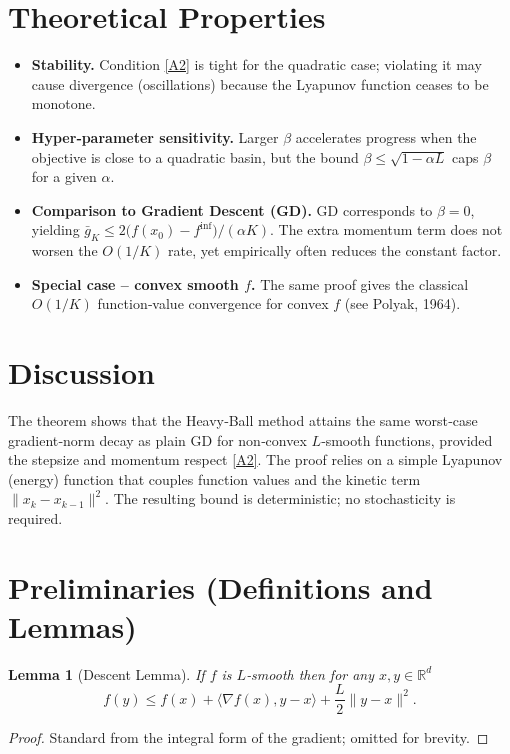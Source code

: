 \documentclass{article}
\newtheorem{lemma}{Lemma}
\newcommand{\R}{\mathbb{R}}
\begin{document}
\section*{Theoretical Properties}
\begin{itemize}
\item \textbf{Stability.} Condition \eqref{A2} is tight for the quadratic case; violating it may cause divergence (oscillations) because the Lyapunov function ceases to be monotone.

\item \textbf{Hyper‑parameter sensitivity.} Larger $\beta$ accelerates progress when the objective is close to a quadratic basin, but the bound $\beta\le\sqrt{1-\alpha L}$ caps $\beta$ for a given $\alpha$.

\item \textbf{Comparison to Gradient Descent (GD).} GD corresponds to $\beta=0$, yielding $\bar{g}_{K}\le 2\bigl(f(x_{0})-f^{\inf}\bigr)/(\alpha K)$. The extra momentum term does not worsen the $O(1/K)$ rate, yet empirically often reduces the constant factor.

\item \textbf{Special case – convex smooth $f$.} The same proof gives the classical $O(1/K)$ function‑value convergence for convex $f$ (see Polyak, 1964).
\end{itemize}

\section*{Discussion}
The theorem shows that the Heavy‑Ball method attains the same worst‑case gradient‑norm decay as plain GD for non‑convex $L$‑smooth functions, provided the stepsize and momentum respect \eqref{A2}. The proof relies on a simple Lyapunov (energy) function that couples function values and the kinetic term $\|x_{k}-x_{k-1}\|^{2}$. The resulting bound is deterministic; no stochasticity is required.

\newpage
\section*{Preliminaries (Definitions and Lemmas)}
\begin{lemma}[Descent Lemma]\label{lem:descent}
If $f$ is $L$‑smooth then for any $x,y\in\R^{d}$
\[
f(y)\le f(x)+\langle\nabla f(x),y-x\rangle+\frac{L}{2}\|y-x\|^{2}.
\tag{L1}
\]
\end{lemma}
\begin{proof}
Standard from the integral form of the gradient; omitted for brevity. \qedhere
\end{proof}
\end{document}
